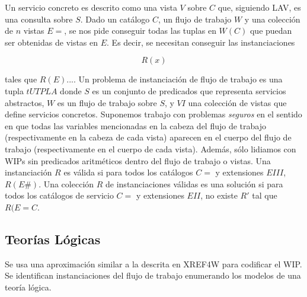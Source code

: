 \documentclass{article}
\begin{document}
Un servicio concreto es descrito como una vista $V$ sobre $C$ que, siguiendo
LAV, es una consulta sobre $S$. Dado un catálogo $C$, un flujo de trabajo $W$ y
una colección de $n$ vistas $E=$, se nos pide conseguir todas las tuplas en
$W(C)$ que puedan ser obtenidas de vistas en $E$. Es decir, se necesitan
conseguir las instanciaciones

$$
R(x)
$$

tales que $R(E)...$. Un problema de instanciación de flujo de trabajo es una
tupla $tUTPLA$ donde $S$ es un conjunto de predicados que representa servicios
abstractos, $W$ es un flujo de trabajo sobre $S$, y $VI$ una colección de vistas
que define servicios concretos. Suponemos trabajo con problemas \emph{seguros}
en el sentido en que todas las variables mencionadas en la cabeza del flujo de
trabajo (respectivamente en la cabeza de cada vista) aparecen en el cuerpo del
flujo de trabajo (respectivamente en el cuerpo de cada vista). Además, sólo
lidiamos con WIPs sin predicados aritméticos dentro del flujo de trabajo o
vistas. Una instanciación $R$ es válida si para todos los catálogos $C=$ y
extensiones $EIII$, $R(E\#)$. Una colección $R$ de instanciaciones válidas es una
solución si para todos los catálogos de servicio $C=$ y extensiones $EII$, no
existe $R'$ tal que $R(E= C$.

\subsection{Teorías Lógicas}

Se usa una aproximación similar a la descrita en XREF4W para codificar el WIP.
Se identifican instanciaciones del flujo de trabajo enumerando los modelos de
una teoría lógica.
\end{document}
